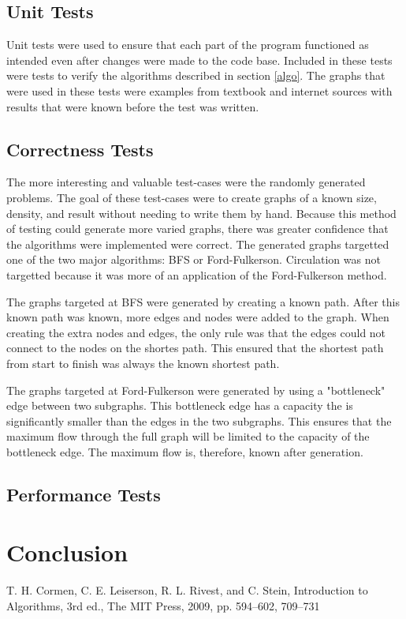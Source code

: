 \documentclass[conference]{IEEEtran}
\begin{document}
\subsection{Unit Tests}
Unit tests were used to ensure that each part of the program functioned as intended even after
changes were made to the code base. Included in these tests were tests to verify the algorithms
described in section \ref{algo}. The graphs that were used in these tests were examples from 
textbook and internet sources with results that were known before the test was written. 

\subsection{Correctness Tests}
The more interesting and valuable test-cases were the randomly generated problems. The goal
of these test-cases were to create graphs of a known size, density, and result without needing
to write them by hand. Because this method of testing could generate more varied graphs, there 
was greater confidence that the algorithms were implemented were correct. The generated graphs 
targetted one of the two major algorithms: BFS or Ford-Fulkerson. Circulation was not targetted
because it was more of an application of the Ford-Fulkerson method.

The graphs targeted at BFS were generated by creating a known path. After this known path was
known, more edges and nodes were added to the graph. When creating the extra nodes and edges, 
the only rule was that the edges could not connect to the nodes on the shortes path. This 
ensured that the shortest path from start to finish was always the known shortest path. 

The graphs targeted at Ford-Fulkerson were generated by using a "bottleneck" edge between 
two subgraphs. This bottleneck edge has a capacity the is significantly smaller than the 
edges in the two subgraphs. This ensures that the maximum flow through the full graph
will be limited to the capacity of the bottleneck edge. The maximum flow is, therefore, 
known after generation.

\subsection{Performance Tests}



\section{Conclusion}

\begin{thebibliography}{00}
     T. H. Cormen, C. E. Leiserson, R. L. Rivest, and C. Stein, Introduction to Algorithms, 3rd ed., The MIT Press, 2009, pp. 594--602, 709--731 
\end{thebibliography}
\end{document}
